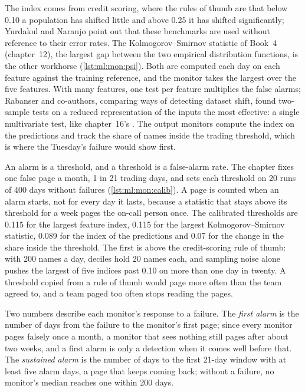 The index comes from credit scoring, where the rules of thumb are that below 0.10 a population has shifted little and above 0.25
it has shifted significantly; Yurdakul and Naranjo point out that these benchmarks are used without reference to their error
rates. The Kolmogorov--Smirnov statistic of Book~4 (chapter~12), the largest gap between the two empirical distribution
functions, is the other workhorse (\cref{lst:ml:mon:psi}). Both are computed each day on each feature against the training
reference, and the monitor takes the largest over the five features. With many features, one test per feature multiplies the
false alarms; Rabanser and co-authors, comparing ways of detecting dataset shift, found two-sample tests on a reduced
representation of the inputs the most effective: a single multivariate test, like chapter~16's . The output monitors compute the index on the predictions
and track the share of names inside the trading threshold, which is where the Tuesday's failure would show first.

An alarm is a threshold, and a threshold is a false-alarm rate. The chapter fixes one false page a month, 1 in 21 trading days,
and sets each threshold on 20 runs of 400 days without failures (\cref{lst:ml:mon:calib}). A page is counted when an alarm
starts, not for every day it lasts, because a statistic that stays above its threshold for a week pages the on-call person once.
The calibrated thresholds are 0.115 for the largest feature index, 0.115 for the largest Kolmogorov--Smirnov statistic, 0.089
for the index of the predictions and 0.07 for the change in the share inside the threshold. The first is above the credit-scoring
rule of thumb: with 200 names a day, deciles hold 20 names each, and sampling noise alone pushes the largest of five indices past
0.10 on more than one day in twenty. A threshold copied from a rule of thumb would page more often than the team agreed to, and
a team paged too often stops reading the pages.

Two numbers describe each monitor's response to a failure. The \emph{first alarm} is the number of days from the failure to the
monitor's first page; since every monitor pages falsely once a month, a monitor that sees nothing still pages after about two
weeks, and a first alarm is only a detection when it comes well before that. The \emph{sustained alarm} is the number of days to
the first 21-day window with at least five alarm days, a page that keeps coming back; without a failure, no monitor's median
reaches one within 200 days.

